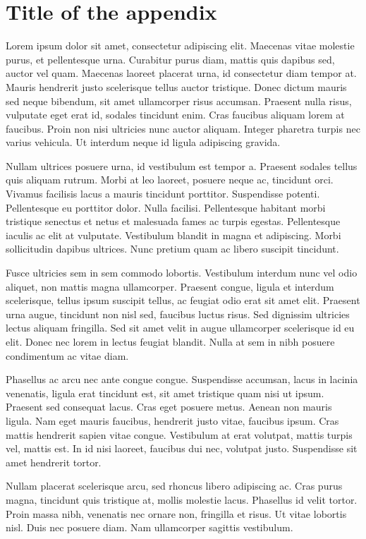 \renewcommand\thechapter{\Alph{chapter}}
\makeatletter
\renewcommand{\@chapapp}{Appendix}
\makeatother
\setcounter{chapter}{0}
\chapter{Title of the appendix}\label{AppA}

\pagestyle{default}

\newpage

\normalsize



Lorem ipsum dolor sit amet, consectetur adipiscing elit. Maecenas vitae molestie purus, et pellentesque urna. Curabitur purus diam, mattis quis dapibus sed, auctor vel quam. Maecenas laoreet placerat urna, id consectetur diam tempor at. Mauris hendrerit justo scelerisque tellus auctor tristique. Donec dictum mauris sed neque bibendum, sit amet ullamcorper risus accumsan. Praesent nulla risus, vulputate eget erat id, sodales tincidunt enim. Cras faucibus aliquam lorem at faucibus. Proin non nisi ultricies nunc auctor aliquam. Integer pharetra turpis nec varius vehicula. Ut interdum neque id ligula adipiscing gravida.

Nullam ultrices posuere urna, id vestibulum est tempor a. Praesent sodales tellus quis aliquam rutrum. Morbi at leo laoreet, posuere neque ac, tincidunt orci. Vivamus facilisis lacus a mauris tincidunt porttitor. Suspendisse potenti. Pellentesque eu porttitor dolor. Nulla facilisi. Pellentesque habitant morbi tristique senectus et netus et malesuada fames ac turpis egestas. Pellentesque iaculis ac elit at vulputate. Vestibulum blandit in magna et adipiscing. Morbi sollicitudin dapibus ultrices. Nunc pretium quam ac libero suscipit tincidunt.

Fusce ultricies sem in sem commodo lobortis. Vestibulum interdum nunc vel odio aliquet, non mattis magna ullamcorper. Praesent congue, ligula et interdum scelerisque, tellus ipsum suscipit tellus, ac feugiat odio erat sit amet elit. Praesent urna augue, tincidunt non nisl sed, faucibus luctus risus. Sed dignissim ultricies lectus aliquam fringilla. Sed sit amet velit in augue ullamcorper scelerisque id eu elit. Donec nec lorem in lectus feugiat blandit. Nulla at sem in nibh posuere condimentum ac vitae diam.

Phasellus ac arcu nec ante congue congue. Suspendisse accumsan, lacus in lacinia venenatis, ligula erat tincidunt est, sit amet tristique quam nisi ut ipsum. Praesent sed consequat lacus. Cras eget posuere metus. Aenean non mauris ligula. Nam eget mauris faucibus, hendrerit justo vitae, faucibus ipsum. Cras mattis hendrerit sapien vitae congue. Vestibulum at erat volutpat, mattis turpis vel, mattis est. In id nisi laoreet, faucibus dui nec, volutpat justo. Suspendisse sit amet hendrerit tortor.

Nullam placerat scelerisque arcu, sed rhoncus libero adipiscing ac. Cras purus magna, tincidunt quis tristique at, mollis molestie lacus. Phasellus id velit tortor. Proin massa nibh, venenatis nec ornare non, fringilla et risus. Ut vitae lobortis nisl. Duis nec posuere diam. Nam ullamcorper sagittis vestibulum. 
